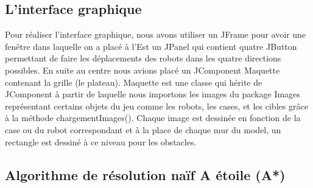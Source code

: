 \documentclass[12pt]{article}
\begin{document}
			
			
			\subsection{L’interface graphique}
			
			Pour réaliser l’interface graphique, nous avons utiliser un JFrame pour avoir une fenêtre dans laquelle on a placé à l’Est un JPanel qui contient  quatre JButton permettant de faire les déplacements des robots dans les quatre directions possibles. 
			En suite au centre nous avions placé un JComponent Maquette contenant la grille (le plateau).
			Maquette est une classe qui hérite de JComponent à partir de laquelle nous importons les images du package Images représentant certains objets du jeu comme les robots, les cases, et les cibles grâce à la méthode chargementImages(). Chaque image est dessinée en fonction de la case ou du robot correspondant et à la place de chaque mur du model, un rectangle est dessiné à ce niveau pour les obstacles.
			
			
		\subsection{Algorithme de résolution naïf A étoile (A*)}
		
\end{document}
